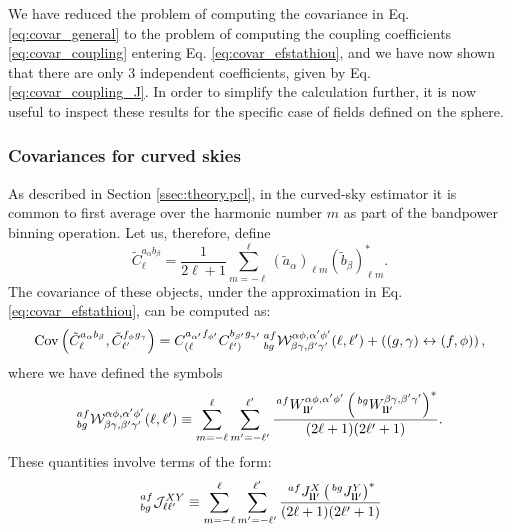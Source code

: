 \documentclass[a4paper,11pt]{article}
\begin{document}
      We have reduced the problem of computing the covariance in Eq. \ref{eq:covar_general} to the problem of computing the coupling coefficients \ref{eq:covar_coupling} entering Eq. \ref{eq:covar_efstathiou}, and we have now shown that there are only 3 independent coefficients, given by Eq. \ref{eq:covar_coupling_J}. In order to simplify the calculation further, it is now useful to inspect these results for the specific case of fields defined on the sphere.
    
      \subsubsection{Covariances for curved skies}
        As described in Section \ref{ssec:theory.pcl}, in the curved-sky
        estimator it is common to first average over the harmonic number $m$
        as part of the bandpower binning operation. Let us, therefore, define
        \begin{equation}
          \tilde{C}^{a_\alpha b_\beta}_\ell=\frac{1}{2\ell+1}\sum_{m=-\ell}^\ell (\tilde{a}_\alpha)_{\ell m} (\tilde{b}_\beta)_{\ell m}^*.
        \end{equation}
        The covariance of these objects, under the approximation in Eq. \ref{eq:covar_efstathiou}, can be computed as:
        \begin{equation}\label{eq:cov_sph}
          {\rm Cov}\left(\tilde{C}^{a_\alpha b_\beta}_\ell,\tilde{C}^{f_\phi g_\gamma}_{\ell'}\right) = C^{a_{\alpha'} f_{\phi'}}_{(\ell}C^{b_{\beta'} g_{\gamma'}}_{\ell')}\,^{af}_{bg}\mathcal{W}^{\alpha\phi,\alpha'\phi'}_{\beta\gamma,\beta'\gamma'}(\ell,\ell')+\left((g,\gamma)\leftrightarrow(f,\phi)\right),
        \end{equation}
        where we have defined the symbols
        \begin{equation}
          ^{af}_{bg}\mathcal{W}^{\alpha\phi,\alpha'\phi'}_{\beta\gamma,\beta'\gamma'}(\ell,\ell')\equiv\sum_{m=-\ell}^\ell \sum_{m'=-\ell'}^{\ell'}\frac{\,^{af}W^{\alpha\phi,\alpha'\phi'}_{{\bf l}{\bf l}'}\left(\,^{bg}W^{\beta\gamma,\beta'\gamma'}_{{\bf l}{\bf l}'}\right)^*}{(2\ell+1)(2\ell'+1)}.
        \end{equation}
        These quantities involve terms of the form:
        \begin{equation}
          \,^{af}_{bg}\mathcal{J}^{XY}_{\ell\ell'}\equiv\sum_{m=-\ell}^\ell \sum_{m'=-\ell'}^{\ell'}\frac{\,^{af}J^X_{{\bf l}{\bf l}'}\left(\,^{bg}J^Y_{{\bf l}{\bf l}'}\right)^*}{(2\ell+1)(2\ell'+1)}
        \end{equation}
\end{document}
